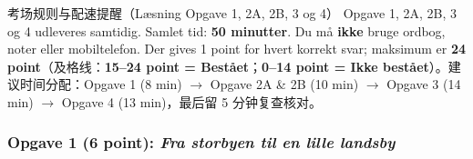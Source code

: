 

\begin{tipbox}{考场规则与配速提醒（Læsning Opgave 1, 2A, 2B, 3 og 4）}
Opgave 1, 2A, 2B, 3 og 4 udleveres samtidig. Samlet tid: \textbf{50 minutter}. Du må \textbf{ikke} bruge ordbog, noter eller mobiltelefon. Der gives 1 point for hvert korrekt svar; maksimum er \textbf{24 point}（及格线：\textbf{15--24 point = Bestået}；\textbf{0--14 point = Ikke bestået}）。建议时间分配：Opgave 1 (8 min) $\rightarrow$ Opgave 2A \& 2B (10 min) $\rightarrow$ Opgave 3 (14 min) $\rightarrow$ Opgave 4 (13 min)，最后留 5 分钟复查核对。
\end{tipbox}

\subsubsection*{Opgave 1 (6 point): \textit{Fra storbyen til en lille landsby}}

